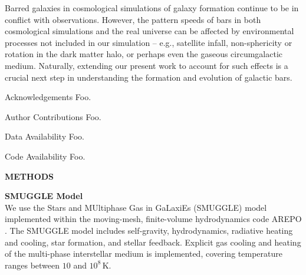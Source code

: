 \documentclass{natureprintstyle}
\begin{document}
Barred galaxies in cosmological simulations of galaxy formation continue to be
in conflict with observations.\cite{2017MNRAS.469.1054A, 2019MNRAS.483.2721P,
2021AA...650L..16F} However, the pattern speeds of bars in both cosmological
simulations and the real universe can be affected by environmental processes
not included in our simulation -- e.g., satellite
infall\cite{2011Natur.477..301P}, non-sphericity\cite{2013MNRAS.429.1949A} or
rotation\cite{2013MNRAS.434.1287S, 2014ApJ...783L..18L, 2018MNRAS.476.1331C,
2019MNRAS.488.5788C} in the dark matter halo, or perhaps even the gaseous
circumgalactic medium. Naturally, extending our present work to account for
such effects is a crucial next step in understanding the formation and
evolution of galactic bars.




\begin{addendum}
  
\item [Acknowledgements] Foo.

\item[Author Contributions] Foo.

  \item[Data Availability] Foo.
    
  \item[Code Availability] Foo.
    
\end{addendum}



\newpage

\setcounter{page}{1}
\setcounter{figure}{0}
\setcounter{table}{0}
\captionsetup[figure]{labelformat=empty}
\renewcommand{\thefigure}{Extended Data \arabic{figure}}
\renewcommand{\thetable}{Extended Data \arabic{table}}

\begin{center}
{\bf \Large \uppercase{Methods} }
\end{center}

\noindent
{\bf SMUGGLE Model}
\\
\noindent
We use the Stars and MUltiphase Gas in GaLaxiEs (SMUGGLE) model
\cite{2019MNRAS.489.4233M} implemented within the moving-mesh, finite-volume
hydrodynamics code AREPO \cite{2010MNRAS.401..791S}. The SMUGGLE model
includes self-gravity, hydrodynamics, radiative heating and cooling, star
formation, and stellar feedback. Explicit gas cooling and heating of the
multi-phase interstellar medium is implemented, covering temperature ranges
between $10$ and $10^8\,\textrm{K}$.
\end{document}
